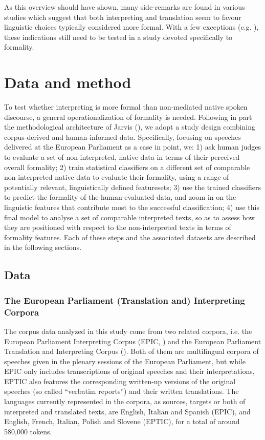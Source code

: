 \documentclass[output=paper]{langscibook}
\begin{document}
As this overview should have shown, many side-remarks are found in various studies which suggest that both interpreting and translation seem to favour linguistic choices typically considered more formal. With a few exceptions (e.g. \citealt{DeSutterEtAl2012}), these indications still need to be tested in a study devoted specifically to formality.

\section{Data and method}\label{sec:ivaska:3}

To test whether interpreting is more formal than non-mediated native spoken discourse, a general operationalization of formality is needed. Following in part the methodological architecture of Jarvis (\citealt[548--549]{Jarvis2017}), we adopt a study design combining corpus-derived and human-informed data. Specifically, focusing on speeches delivered at the European Parliament as a case in point, we: 1) ask human judges to evaluate a set of non-interpreted, native data in terms of their perceived overall formality; 2) train statistical classifiers on a different set of comparable non-interpreted native data to evaluate their formality, using a range of potentially relevant, linguistically defined featuresets; 3) use the trained classifiers to predict the formality of the human-evaluated data, and zoom in on the linguistic features that contribute most to the successful classification; 4) use this final model to analyse a set of comparable interpreted texts, so as to assess how they are positioned with respect to the non-interpreted texts in terms of formality features. Each of these steps and the associated datasets are described in the following sections.

\subsection{Data}\label{sec:ivaska:3.1}

\subsubsection{The European Parliament (Translation and) Interpreting Corpora}\label{sec:ivaska:3.1.1}


The corpus data analyzed in this study come from two related corpora, i.e. the European Parliament Interpreting Corpus (EPIC, \citealt{SandrelliEtAl2010}) and the European Parliament Translation and Interpreting Corpus (\citealt{FerraresiBernardini2019}). Both of them are multilingual corpora of speeches given in the plenary sessions of the European Parliament, but while EPIC only includes transcriptions of original speeches and their interpretations, EPTIC also features the corresponding written-up versions of the original speeches (so called “verbatim reports”) and their written translations. The languages currently represented in the corpora, as sources, targets or both of interpreted and translated texts, are English, Italian and Spanish (EPIC), and English, French, Italian, Polish and Slovene (EPTIC), for a total of around 580,000 tokens. 
\end{document}
